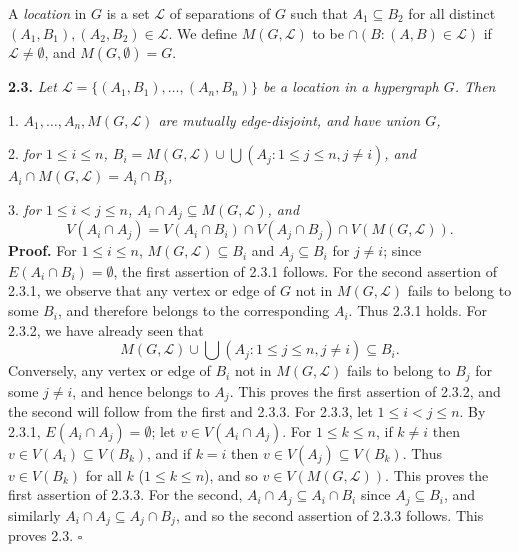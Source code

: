 A \textit{location} in $G$ is a set $\mathscr{L}$ of separations of $G$ such that $A_1 \subseteq B_2$ for all distinct $(A_1, B_1), (A_2, B_2) \in \mathscr{L}$. We define $M(G, \mathscr{L})$ to be $\cap(B: (A, B) \in \mathscr{L})$ if $\mathscr{L} \ne \emptyset$, and $M(G, \emptyset) = G$.

\textbf{2.3.} \textit{Let $\mathscr{L} = \{(A_1, B_1), \dots, (A_n, B_n)\}$ be a location in a hypergraph $G$. Then}

\hspace*{12pt}1. \textit{$A_1, \dots, A_n, M(G, \mathscr{L})$ are mutually edge-disjoint, and have union $G$,}

\hspace*{12pt}2. \textit{for $1 \le i \le n$, $B_i = M(G, \mathscr{L}) \cup \bigcup(A_j: 1 \le j \le n, j \ne i)$, and $A_i \cap M(G, \mathscr{L}) = A_i \cap B_i$,}

\hspace*{12pt}3. \textit{for $1 \le i < j \le n$, $A_i \cap A_j \subseteq M(G, \mathscr{L})$, and}
\begin{equation*}
V(A_i \cap A_j) = V(A_i \cap B_i) \cap V(A_j \cap B_j) \cap V(M(G, \mathscr{L})).
\end{equation*}
\textbf{Proof.} For $1 \le i \le n$, $M(G, \mathscr{L}) \subseteq B_i$ and $A_j \subseteq B_i$ for $j \ne i$; since $E(A_i \cap B_i) = \emptyset$, the first assertion of 2.3.1 follows. For the second assertion of 2.3.1, we observe that any vertex or edge of $G$ not in $M(G, \mathscr{L})$ fails to belong to some $B_i$, and therefore belongs to the corresponding $A_i$. Thus 2.3.1 holds. For 2.3.2, we have already seen that
\begin{equation*}
M(G, \mathscr{L}) \cup \bigcup(A_j: 1 \le j \le n, j \ne i) \subseteq B_i.
\end{equation*}
Conversely, any vertex or edge of $B_i$ not in $M(G, \mathscr{L})$ fails to belong to $B_j$ for some $j \ne i$, and hence belongs to $A_j$. This proves the first assertion of 2.3.2, and the second will follow from the first and 2.3.3. For 2.3.3, let $1 \le i < j \le n$. By 2.3.1, $E(A_i \cap A_j) = \emptyset$; let $v \in V(A_i \cap A_j)$. For $1 \le k \le n$, if $k \ne i$ then $v \in V(A_i) \subseteq V(B_k)$, and if $k = i$ then $v \in V(A_j) \subseteq V(B_k)$. Thus $v \in V(B_k)$ for all $k$ ($1 \le k \le n$), and so $v \in V(M(G, \mathscr{L}))$. This proves the first assertion of 2.3.3. For the second, $A_i \cap A_j \subseteq A_i \cap B_i$ since $A_j \subseteq B_i$, and similarly $A_i \cap A_j \subseteq A_j \cap B_j$, and so the second assertion of 2.3.3 follows. This proves 2.3. $\square$

